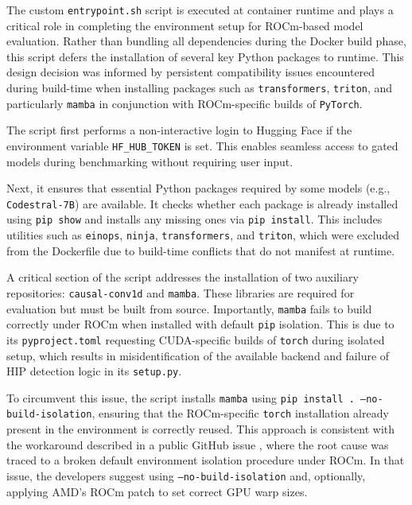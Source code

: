 The custom \texttt{entrypoint.sh} script is executed at container runtime and plays a critical role in completing the environment setup for ROCm-based model evaluation. Rather than bundling all dependencies during the Docker build phase, this script defers the installation of several key Python packages to runtime. This design decision was informed by persistent compatibility issues encountered during build-time when installing packages such as \texttt{transformers}, \texttt{triton}, and particularly \texttt{mamba} in conjunction with ROCm-specific builds of \texttt{PyTorch}.

The script first performs a non-interactive login to Hugging Face if the environment variable \texttt{HF\_HUB\_TOKEN} is set. This enables seamless access to gated models during benchmarking without requiring user input.

Next, it ensures that essential Python packages required by some models (e.g., \texttt{Codestral-7B}) are available. It checks whether each package is already installed using \texttt{pip show} and installs any missing ones via \texttt{pip install}. This includes utilities such as \texttt{einops}, \texttt{ninja}, \texttt{transformers}, and \texttt{triton}, which were excluded from the Dockerfile due to build-time conflicts that do not manifest at runtime.

A critical section of the script addresses the installation of two auxiliary repositories: \texttt{causal-conv1d} and \texttt{mamba}. These libraries are required for evaluation but must be built from source. Importantly, \texttt{mamba} fails to build correctly under ROCm when installed with default \texttt{pip} isolation. This is due to its \texttt{pyproject.toml} requesting CUDA-specific builds of \texttt{torch} during isolated setup, which results in misidentification of the available backend and failure of HIP detection logic in its \texttt{setup.py}.

To circumvent this issue, the script installs \texttt{mamba} using \texttt{pip install . --no-build-isolation}, ensuring that the ROCm-specific \texttt{torch} installation already present in the environment is correctly reused. This approach is consistent with the workaround described in a public GitHub issue \autocite{mamba_rocm_conflict}, where the root cause was traced to a broken default environment isolation procedure under ROCm. In that issue, the developers suggest using \texttt{--no-build-isolation} and, optionally, applying AMD's ROCm patch \autocite{rocm_patch_405} to set correct GPU warp sizes.

